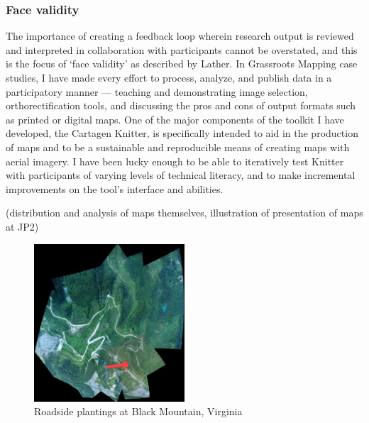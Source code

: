 \documentclass[11pt,oneside,notitlepage]{report}
\begin{document}
\subsubsection{Face validity}

The importance of creating a feedback loop wherein research output is reviewed and interpreted in collaboration with participants cannot be overstated, and this is the focus of `face validity' as described by Lather. In Grassroots Mapping case studies, I have made every effort to process, analyze, and publish data in a participatory manner --- teaching and demonstrating image selection, orthorectification tools, and discussing the pros and cons of output formats such as printed or digital maps. One of the major components of the toolkit I have developed, the Cartagen Knitter, is specifically intended to aid in the production of maps and to be a sustainable and reproducible means of creating maps with aerial imagery. I have been lucky enough to be able to iteratively test Knitter with participants of varying levels of technical literacy, and to make incremental improvements on the tool's interface and abilities.  

(distribution and analysis of maps themselves, illustration of presentation of maps at JP2)

\begin{figure}
  \begin{flushright}
	\includegraphics[width=0.5\textwidth]{images/black-mountain.jpg}
	\caption{Roadside plantings at Black Mountain, Virginia}
  \end{flushright}
\end{figure}
\end{document}
